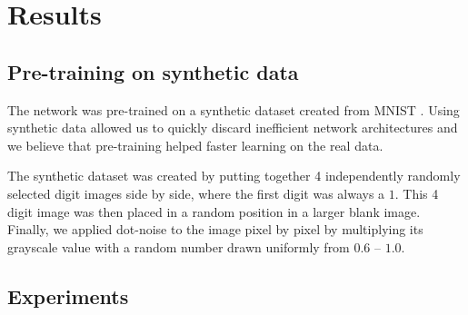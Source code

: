\section{Results}

\subsection{Pre-training on synthetic data} \label{ssec:pretrain}
The network was pre-trained on a synthetic dataset created from MNIST \cite{MNIST_orig}. Using synthetic data allowed us to quickly discard inefficient network architectures and we believe that pre-training helped faster learning on the real data.

The synthetic dataset was created by putting together 4 independently randomly selected digit images side by side, where the first digit was always a $1$. This 4 digit image was then placed in a random position in a larger blank image. Finally, we applied dot-noise to the image pixel by pixel by multiplying its grayscale value with a random number drawn uniformly from $0.6$ -- $1.0$.


\subsection{Experiments}

